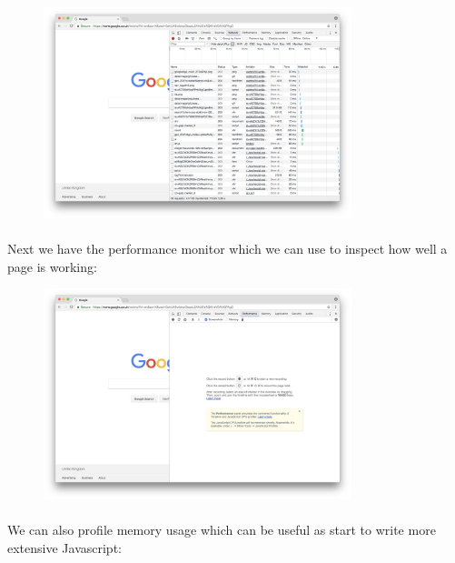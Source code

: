 \begin{figure}[H]
\centering
\includegraphics[width=0.8\textwidth]{figures/devtools-network.png}
\label{fig:devtools-network}
\end{figure}


\paragraph{} Next we have the performance monitor which we can use to inspect how well a page is working:

\begin{figure}[H]
\centering
\includegraphics[width=0.8\textwidth]{figures/devtools-performance.png}
\label{fig:devtools-performance}
\end{figure}

\paragraph{} We can also profile memory usage which can be useful as start to write more extensive Javascript:

